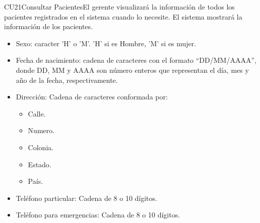 \begin{UseCase}{CU21}{Consultar Pacientes}{El gerente visualizará la información de todos los pacientes registrados en el sistema cuando lo necesite. El sistema mostrará la información de los pacientes.}
{\begin{itemize}
\begin{itemize}
\begin{itemize}
					\item Apellido paterno.
					\item Apellido materno.
		        \end{itemize}
		        \item Sexo: caracter 'H' o 'M'. 'H' si es Hombre, 'M' si es mujer.
		        \item Fecha de nacimiento: cadena de caracteres con el formato ``DD/MM/AAAA'', donde DD, MM y AAAA son número enteros que representan el día, mes y año de la fecha, respectivamente.
		        \item Dirección: Cadena de caracteres conformada por:
		        \begin{itemize}
		        	\item Calle.
		        	\item Numero.
		        	\item Colonia.
		        	\item Estado.
		        	\item País.
		        \end{itemize}
		        \item Teléfono particular: Cadena de 8 o 10 dígitos.
		        \item Teléfono para emergencias: Cadena de 8 o 10 dígitos.
		    \end{itemize}   
		\end{itemize}
	}
	

\end{UseCase}
